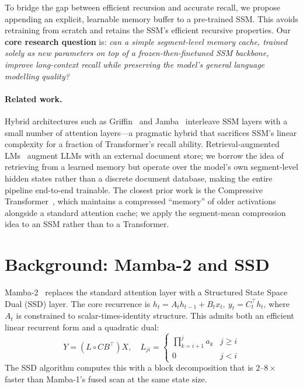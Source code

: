 \documentclass{article}
\begin{document}
To bridge the gap between efficient recursion and accurate recall, we propose appending an explicit, learnable memory buffer to a pre-trained SSM. This avoids retraining from scratch and retains the SSM's efficient recursive properties. Our \textbf{core research question} is: \emph{can a simple segment-level memory cache, trained solely as new parameters on top of a frozen-then-finetuned SSM backbone, improve long-context recall while preserving the model's general language modelling quality?}

\paragraph{Related work.}
Hybrid architectures such as Griffin~\citep{de2024griffinmixinggatedlinear} and Jamba~\citep{lieber2024jambahybridtransformermambalanguage} interleave SSM layers with a small number of attention layers---a pragmatic hybrid that sacrifices SSM's linear complexity for a fraction of Transformer's recall ability. Retrieval-augmented LMs~\citep{lewis2021retrievalaugmentedgenerationknowledgeintensivenlp} augment LLMs with an external document store; we borrow the idea of retrieving from a learned memory but operate over the model's own segment-level hidden states rather than a discrete document database, making the entire pipeline end-to-end trainable. The closest prior work is the Compressive Transformer~\citep{rae2019compressivetransformerslongrangesequence}, which maintains a compressed ``memory'' of older activations alongside a standard attention cache; we apply the segment-mean compression idea to an SSM rather than to a Transformer.

\section{Background: Mamba-2 and SSD}
\label{sec:background}

Mamba-2~\citep{dao2024transformersssmsgeneralizedmodels} replaces the standard attention layer with a Structured State Space Dual (SSD) layer. The core recurrence is $h_t = A_t h_{t-1} + B_t x_t,\ y_t = C_t^\top h_t$, where $A_t$ is constrained to scalar-times-identity structure. This admits both an efficient linear recurrent form and a quadratic dual:
\begin{equation}
    Y = (L \circ CB^\top) X,\quad
    L_{ji} = \begin{cases}\prod_{k=i+1}^{j} a_k & j \ge i \\ 0 & j < i\end{cases}
\end{equation}
The SSD algorithm computes this with a block decomposition that is $2$--$8\times$ faster than Mamba-1's fused scan at the same state size.
\end{document}
